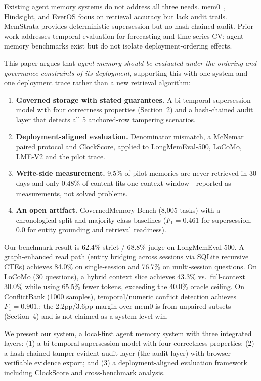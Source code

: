 \documentclass{llncs}
\begin{document}
Existing agent memory systems do not address all three needs. mem0~\cite{mem0}, Hindsight, and EverOS focus on retrieval accuracy but lack audit trails. MemStrata provides deterministic supersession but no hash-chained audit. Prior work addresses temporal evaluation for forecasting and time-series CV; agent-memory benchmarks exist but do not isolate deployment-ordering effects.

This paper argues that \emph{agent memory should be evaluated under the ordering and governance constraints of its deployment}, supporting this with one system and one deployment trace rather than a new retrieval algorithm: \begin{enumerate} \item \textbf{Governed storage with stated guarantees.} A bi-temporal supersession model with four correctness properties (Section~2) and a hash-chained audit layer that detects all 5 anchored-row tampering scenarios. \item \textbf{Deployment-aligned evaluation.} Denominator mismatch, a McNemar paired protocol and ClockScore, applied to LongMemEval-500, LoCoMo, LME-V2 and the pilot trace. \item \textbf{Write-side measurement.} 9.5\% of pilot memories are never retrieved in 30 days and only 0.48\% of content fits one context window---reported as measurements, not solved problems. \item \textbf{An open artifact.} GovernedMemory Bench (8{,}005 tasks) with a chronological split and majority-class baselines ($F_1{=}0.461$ for supersession, 0.0 for entity grounding and retrieval readiness). \end{enumerate} Our benchmark result is 62.4\% strict / 68.8\% judge on LongMemEval-500. A graph-enhanced read path (entity bridging across sessions via SQLite recursive CTEs) achieves 84.0\% on single-session and 76.7\% on multi-session questions. On LoCoMo (30 questions), a hybrid context slice achieves 43.3\% vs.\ full-context 30.0\% while using 65.5\% fewer tokens, exceeding the 40.0\% oracle ceiling. On ConflictBank (1{}000 samples), temporal/numeric conflict detection achieves $F_1{=}0.901$.; the 2.2pp/3.6pp margin over mem0 is from unpaired subsets (Section~4) and is not claimed as a system-level win.

We present our system, a local-first agent memory system with three integrated layers: (1) a bi-temporal supersession model with four correctness properties; (2) a hash-chained tamper-evident audit layer (the audit layer) with browser-verifiable evidence export; and (3) a deployment-aligned evaluation framework including ClockScore and cross-benchmark analysis.
\end{document}
